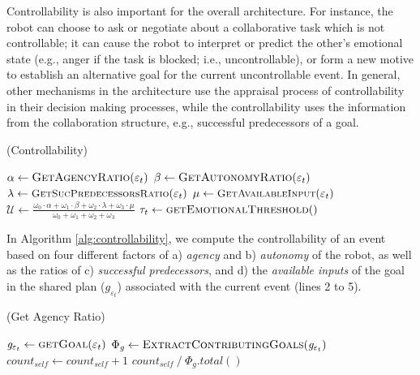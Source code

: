\documentclass[letterpaper]{article}
\begin{document}
Controllability is also important for the overall architecture. For instance,
the robot can choose to ask or negotiate about a collaborative task which is
not controllable; it can cause the robot to interpret or predict the other's
emotional state (e.g., anger if the task is blocked; i.e., uncontrollable), or
form a new motive to establish an alternative goal for the current
uncontrollable event. In general, other mechanisms in the architecture use the
appraisal process of controllability in their decision making processes, while
the controllability uses the information from the collaboration structure,
e.g., successful predecessors of a goal.

\begin{algorithm}
	\caption{(Controllability)}
	\label{alg:controllability}
	\begin{algorithmic}[1]
			\Statex
			\State $\alpha \gets \Call{GetAgencyRatio}{\varepsilon_t}$ 
			\State $\beta \gets \Call{GetAutonomyRatio}{\varepsilon_t}$
			\Statex
			\State $\lambda \gets
			\Call{\small{GetSucPredecessorsRatio}}{\varepsilon_t}$
			\State $\mu \gets
			\Call{\small{GetAvailableInput}}{\varepsilon_t}$
			\Statex
			\State $\mathcal{U} \gets
			\frac{\omega_{0}\cdot \alpha + \omega_{1}\cdot \beta + \omega_{2}\cdot
			\lambda + \omega_{3}\cdot \mu}{\omega_{0} + \omega_{1} + \omega_{2} +
			\omega_{3}}$
			\Statex
			\State $\tau_{t} \gets \Call{getEmotionalThreshold}{ }$
			\Statex
				\State {}
			\Else
				\State {}
			\EndIf
		\EndFunction
	\end{algorithmic}
\end{algorithm}

In Algorithm \ref{alg:controllability}, we compute the controllability of an
event based on four different factors of a) \textit{agency} and b)
\textit{autonomy} of the robot, as well as the ratios of c) \textit{successful
predecessors}, and d) the \textit{available inputs} of the goal in the shared
plan ($\mathit{g}_{\varepsilon_t}$) associated with the current event (lines 2
to 5).

\begin{algorithm}
	\caption{(Get Agency Ratio)}
	\label{alg:agency}
	\begin{algorithmic}[1]
			\Statex
			\State $\mathit{g}_{\varepsilon_t} \gets \Call{getGoal}{\varepsilon_t}$
			\Statex
				\State {}
			\EndIf
			\Statex
			\State $\Phi_{\mathit{g}} \gets
			\Call{ExtractContributingGoals}{\mathit{g}_{\varepsilon_t}}$
			\Statex
				 \State $count_{self}
				\gets count_{self} + 1$
				\EndIf
			\EndFor
			\Statex
			\State \Return 
			${count_{self} \mathbin{/} {{\Phi_{\mathit{g}}}.total()}}$
		\EndFunction 
	\end{algorithmic}
\end{algorithm}
\end{document}
